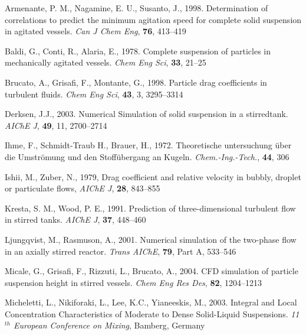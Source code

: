 \begin{thebibliography}{99}

 Armenante, P. M., Nagamine, E. U., Susanto, J., 1998. Determination of correlations to predict the minimum agitation speed for complete solid suspension in agitated vessels. \textit{Can J Chem Eng}, \textbf{76}, 413--419

 Baldi, G., Conti, R., Alaria, E., 1978. Complete suspension of particles in mechanically agitated vessels. \textit{Chem Eng Sci}, \textbf{33}, 21--25 

 Brucato, A., Grisafi, F., Montante, G., 1998. Particle drag coefficients in turbulent fluids. \textit{Chem Eng Sci}, \textbf{43}, 3, 3295--3314

 Derksen, J.J., 2003. Numerical Simulation of solid suspension in a stirredtank. \textit{AIChE J}, \textbf{49}, 11, 2700--2714

 Ihme, F., Schmidt-Traub H., Brauer, H., 1972. Theoretische untersuchung \"uber die Umstr\"omung und den Stoff\"ubergang an Kugeln. \textit{Chem.-Ing.-Tech.}, \textbf{44}, 306

 Ishii, M., Zuber, N., 1979, Drag coefficient and relative velocity in bubbly, droplet or particulate flows, \textit{AIChE J}, \textbf{28}, 843--855 

 Kresta, S. M., Wood, P. E., 1991. Prediction of three-dimensional turbulent flow in stirred tanks. \textit{AIChE J}, \textbf{37}, 448--460 

 Ljungqvist, M., Rasmuson, A., 2001. Numerical simulation of the two-phase flow in an axially stirred reactor. \textit{Trans AIChE}, \textbf{79}, Part A, 533--546

 Micale, G., Grisafi, F., Rizzuti, L., Brucato, A., 2004. CFD simulation of particle suspension height in stirred vessels. \textit{Chem Eng Res Des}, \textbf{82}, 1204--1213

 Micheletti, L., Nikiforaki, L., Lee, K.C., Yianeeskis, M., 2003. Integral and Local Concentration Characteristics of Moderate to Dense Solid-Liquid Suspensions. \textit{11$^{th}$ European Conference on Mixing}, Bamberg, Germany


\end{thebibliography}
